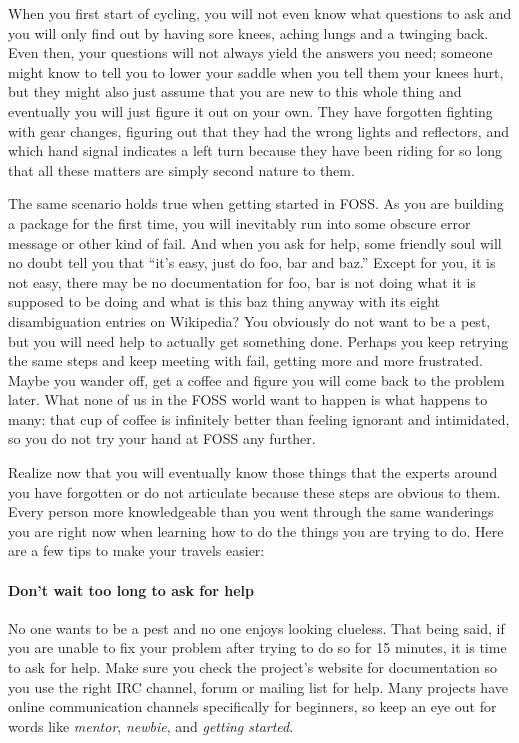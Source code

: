 When you first start of cycling, you will not even know what questions to ask and you will only find out by having sore knees, aching lungs and a twinging back. Even then, your questions will not always yield the answers you need; someone might know to tell you to lower your saddle when you tell them your knees hurt, but they might also just assume that you are new to this whole thing and eventually you will just figure it out on your own. They have forgotten fighting with gear changes, figuring out that they had the wrong lights and reflectors, and which hand signal indicates a left turn because they have been riding for so long that all these matters are simply second nature to them.

The same scenario holds true when getting started in FOSS. As you are building a package for the first time, you will inevitably run into some obscure error message or other kind of fail. And when you ask for help, some friendly soul will no doubt tell you that ``it’s easy, just do foo, bar and baz.'' Except for you, it is not easy, there may be no documentation for foo, bar is not doing what it is supposed to be doing and what is this baz thing anyway with its eight disambiguation entries on Wikipedia? You obviously do not want to be a pest, but you will need help to actually get something done. Perhaps you keep retrying the same steps and keep meeting with fail, getting more and more frustrated. Maybe you wander off, get a coffee and figure you will come back to the problem later. What none of us in the FOSS world want to happen is what happens to many: that cup of coffee is infinitely better than feeling ignorant and intimidated, so you do not try your hand at FOSS any further.

Realize now that you will eventually know those things that the experts around you have forgotten or do not articulate because these steps are obvious to them. Every person more knowledgeable than you went through the same wanderings you are right now when learning how to do the things you are trying to do. Here are a few tips to make your travels easier:

\paragraph*{Don’t wait too long to ask for help} No one wants to be a pest and no one enjoys looking clueless. That being said, if you are unable to fix your problem after trying to do so for 15 minutes, it is time to ask for help. Make sure you check the project’s website for documentation so you use the right IRC channel, forum or mailing list for help. Many projects have online communication channels specifically for beginners, so keep an eye out for words like \textit{mentor}, \textit{newbie}, and \textit{getting started}.

